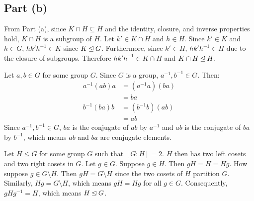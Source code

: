\documentclass{article}
\begin{document}
\subsection*{Part (b)}
From Part (a), since $K \cap H \subseteq H$ and the identity, closure, and inverse properties hold, $K \cap H$ is a subgroup of $H$. Let $k' \in K \cap H$ and $h \in H$. Since $k' \in K$ and $h \in G$, $hk'h^{-1} \in K$ since $K \unlhd G$. Furthermore, since $k' \in H$, $hk'h^{-1} \in H$ due to the closure of subgroups. Therefore $hk'h^{-1} \in K \cap H$ and $K \cap H \unlhd H$.

\clearpage

Let $a, b \in G$ for some group $G$. Since $G$ is a group, $a^{-1}, b^{-1} \in G$. Then:
\begin{equation}
    \begin{split}
        a^{-1}\left(ab\right)a & = \left(a^{-1}a\right)\left(ba\right) \\
        & = ba \\
        b^{-1}\left(ba\right)b & = \left(b^{-1}b\right)\left(ab\right) \\
        & = ab
    \end{split}
\end{equation}
Since $a^{-1}, b^{-1} \in G$, $ba$ is the conjugate of $ab$ by $a^{-1}$ and $ab$ is the conjugate of $ba$ by $b^{-1}$, which means $ab$ and $ba$ are conjugate elements.

\clearpage

Let $H \leq G$ for some group $G$ such that $[G : H] = 2$. $H$ then has two left cosets and two right cosets in $G$. Let $g \in G$. Suppose $g \in H$. Then $gH = H = Hg$. How suppose $g \in G \setminus H$. Then $gH = G \setminus H$ since the two cosets of $H$ partition $G$. Similarly, $Hg = G \setminus H$, which means $gH = Hg$ for all $g \in G$. Consequently, $gHg^{-1} = H$, which means $H \unlhd G$.
\end{document}
